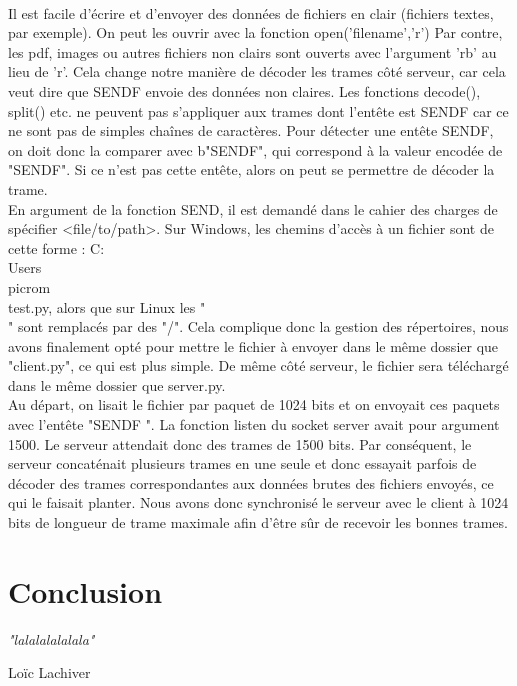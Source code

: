 \documentclass[12pt]{article}
\begin{document}
{
\\
Il est facile d'écrire et d'envoyer des données de fichiers en clair (fichiers textes, par exemple). On peut les ouvrir avec la fonction open('filename','r')
Par contre, les pdf, images ou autres fichiers non clairs sont ouverts avec l'argument 'rb' au lieu de 'r'.
Cela change notre manière de décoder les trames côté serveur, car cela veut dire que SENDF envoie des données non claires.
Les fonctions decode(), split() etc. ne peuvent pas s'appliquer aux trames dont l'entête est SENDF car ce ne sont pas de simples chaînes de caractères.
Pour détecter une entête SENDF, on doit donc la comparer avec b"SENDF", qui correspond à la valeur encodée de "SENDF". Si ce n'est pas cette entête, alors on peut se permettre de décoder la trame.
\\
En argument de la fonction SEND, il est demandé dans le cahier des charges de spécifier <file/to/path>.
Sur Windows, les chemins d'accès à un fichier sont de cette forme : C:\\Users\\picrom\\test.py, alors que sur Linux les "\\" sont remplacés par des "/".
Cela complique donc la gestion des répertoires, nous avons finalement opté pour mettre le fichier à envoyer dans le même dossier que "client.py", ce qui est plus simple.
De même côté serveur, le fichier sera téléchargé dans le même dossier que server.py.
\\
Au départ, on lisait le fichier par paquet de 1024 bits et on envoyait ces paquets avec l'entête "SENDF ".
La fonction listen du socket server avait pour argument 1500. Le serveur attendait donc des trames de 1500 bits.
Par conséquent, le serveur concaténait plusieurs trames en une seule et donc essayait parfois de décoder des trames correspondantes aux données brutes des fichiers envoyés, ce qui le faisait planter.
Nous avons donc synchronisé le serveur avec le client à 1024 bits de longueur de trame maximale afin d'être sûr de recevoir les bonnes trames.


\section{Conclusion}

\emph{"lalalalalalala"}
\begin{flushright}
    Loïc Lachiver
\end{flushright}



}
\end{document}
